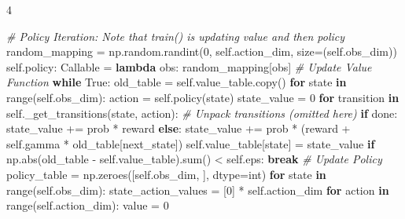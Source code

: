 \documentclass{article}
\newenvironment{Shaded}{\CodeFontSize\setlength{\topsep}{\CodeBlockSkip}\setlength{\partopsep}{0pt}}{}
\newcommand{\BuiltInTok}[1]{\textcolor[rgb]{0.00,0.50,0.00}{#1}}
\newcommand{\CommentTok}[1]{\textcolor[rgb]{0.38,0.63,0.69}{\textit{#1}}}
\newcommand{\ControlFlowTok}[1]{\textcolor[rgb]{0.00,0.44,0.13}{\textbf{#1}}}
\newcommand{\DecValTok}[1]{\textcolor[rgb]{0.25,0.63,0.44}{#1}}
\newcommand{\KeywordTok}[1]{\textcolor[rgb]{0.00,0.44,0.13}{\textbf{#1}}}
\newcommand{\NormalTok}[1]{#1}
\newcommand{\OperatorTok}[1]{\textcolor[rgb]{0.40,0.40,0.40}{#1}}
\newcommand{\VariableTok}[1]{\textcolor[rgb]{0.10,0.09,0.49}{#1}}
\newcommand{\CodeFontSize}{\fontsize{3.6}{4}\selectfont}
\newlength{\CodeBlockSkip}
\newcommand{\NumCodeColumns}{4}  %
\begin{document}
\begin{multicols*}{\NumCodeColumns}
\begin{Shaded}
\begin{Highlighting}[]
\CommentTok{\# Policy Iteration: Note that train() is updating value and then policy}
\NormalTok{random\_mapping }\OperatorTok{=}\NormalTok{ np.random.randint(}\DecValTok{0}\NormalTok{, }\VariableTok{self}\NormalTok{.action\_dim, size}\OperatorTok{=}\NormalTok{(}\VariableTok{self}\NormalTok{.obs\_dim))}
\VariableTok{self}\NormalTok{.policy: Callable }\OperatorTok{=} \KeywordTok{lambda}\NormalTok{ obs: random\_mapping[obs]}
\CommentTok{\# Update Value Function}
\ControlFlowTok{while} \VariableTok{True}\NormalTok{:}
\NormalTok{    old\_table }\OperatorTok{=} \VariableTok{self}\NormalTok{.value\_table.copy()}
    \ControlFlowTok{for}\NormalTok{ state }\KeywordTok{in} \BuiltInTok{range}\NormalTok{(}\VariableTok{self}\NormalTok{.obs\_dim):}
\NormalTok{      action }\OperatorTok{=} \VariableTok{self}\NormalTok{.policy(state)}
\NormalTok{      state\_value }\OperatorTok{=} \DecValTok{0}
      \ControlFlowTok{for}\NormalTok{ transition }\KeywordTok{in} \VariableTok{self}\NormalTok{.\_get\_transitions(state, action):}
        \CommentTok{\# Unpack transitions (omitted here)}
        \ControlFlowTok{if}\NormalTok{ done:}
\NormalTok{          state\_value }\OperatorTok{+=}\NormalTok{ prob }\OperatorTok{*}\NormalTok{ reward}
        \ControlFlowTok{else}\NormalTok{:}
\NormalTok{          state\_value }\OperatorTok{+=}\NormalTok{ prob }\OperatorTok{*}\NormalTok{ (reward }\OperatorTok{+} \VariableTok{self}\NormalTok{.gamma }\OperatorTok{*}\NormalTok{ old\_table[next\_state])}
      \VariableTok{self}\NormalTok{.value\_table[state] }\OperatorTok{=}\NormalTok{ state\_value}
    \ControlFlowTok{if}\NormalTok{ np.}\BuiltInTok{abs}\NormalTok{(old\_table }\OperatorTok{{-}} \VariableTok{self}\NormalTok{.value\_table).}\BuiltInTok{sum}\NormalTok{() }\OperatorTok{\textless{}} \VariableTok{self}\NormalTok{.eps:}
      \ControlFlowTok{break}
\CommentTok{\# Update Policy }
\NormalTok{policy\_table }\OperatorTok{=}\NormalTok{ np.zeroes([}\VariableTok{self}\NormalTok{.obs\_dim, ], dtype}\OperatorTok{=}\BuiltInTok{int}\NormalTok{)}
\ControlFlowTok{for}\NormalTok{ state }\KeywordTok{in} \BuiltInTok{range}\NormalTok{(}\VariableTok{self}\NormalTok{.obs\_dim):}
\NormalTok{  state\_action\_values }\OperatorTok{=}\NormalTok{ [}\DecValTok{0}\NormalTok{] }\OperatorTok{*} \VariableTok{self}\NormalTok{.action\_dim}
  \ControlFlowTok{for}\NormalTok{ action }\KeywordTok{in} \BuiltInTok{range}\NormalTok{(}\VariableTok{self}\NormalTok{.action\_dim):}
\NormalTok{    value }\OperatorTok{=} \DecValTok{0} 

\end{Highlighting}
\end{Shaded}
\end{multicols*}
\end{document}

